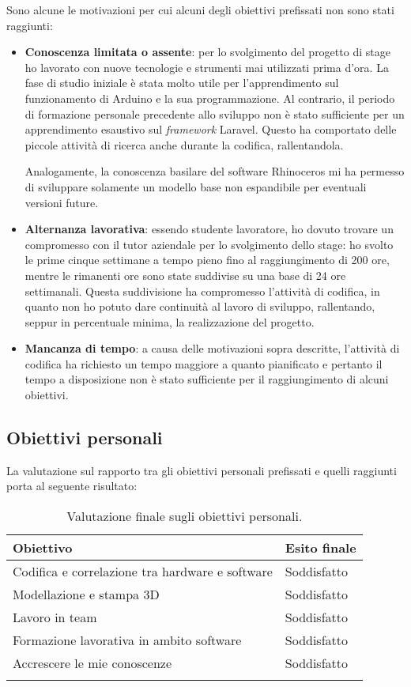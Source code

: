Sono alcune le motivazioni per cui alcuni degli obiettivi prefissati non sono stati raggiunti:

\begin{itemize}
\item \textbf{Conoscenza limitata o assente}: per lo svolgimento del progetto di stage ho lavorato con nuove tecnologie e strumenti mai utilizzati prima d'ora. La fase di studio iniziale è stata molto utile per l'apprendimento sul funzionamento di Arduino e la sua programmazione. Al contrario, il periodo di formazione personale precedente allo sviluppo non è stato sufficiente per un apprendimento esaustivo sul \textit{framework} Laravel. Questo ha comportato delle piccole attività di ricerca anche durante la codifica, rallentandola.

Analogamente, la conoscenza basilare del software Rhinoceros mi ha permesso di sviluppare solamente un modello base non espandibile per eventuali versioni future.
\item \textbf{Alternanza lavorativa}: essendo studente lavoratore, ho dovuto trovare un compromesso con il tutor aziendale per lo svolgimento dello stage: ho svolto le prime cinque settimane a tempo pieno fino al raggiungimento di 200 ore, mentre le rimanenti ore sono state suddivise su una base di 24 ore settimanali. Questa suddivisione ha compromesso l'attività di codifica, in quanto non ho potuto dare continuità al lavoro di sviluppo, rallentando, seppur in percentuale minima, la realizzazione del progetto.
\item \textbf{Mancanza di tempo}: a causa delle motivazioni sopra descritte, l'attività di codifica ha richiesto un tempo maggiore a quanto pianificato e pertanto il tempo a disposizione non è stato sufficiente per il raggiungimento di alcuni obiettivi.
\end{itemize}

\subsection{Obiettivi personali}
La valutazione sul rapporto tra gli obiettivi personali prefissati e quelli raggiunti porta al seguente risultato:

\begin{longtable}{|p{10.5cm}|p{3cm}|}
\hline
\textbf{Obiettivo} & \textbf{Esito finale} \\ 
\hline
Codifica e correlazione tra hardware e software & Soddisfatto \\ 
\hline
Modellazione e stampa 3D & Soddisfatto \\ 
\hline
Lavoro in team & Soddisfatto \\ 
\hline
Formazione lavorativa in ambito software & Soddisfatto \\ 
\hline
Accrescere le mie conoscenze & Soddisfatto \\ 
\hline
\caption{Valutazione finale sugli obiettivi personali.}
\end{longtable}

